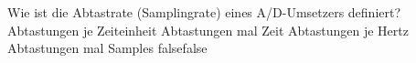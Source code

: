     {Wie ist die Abtastrate (Samplingrate) eines A/D-Umsetzers definiert?}
    {Abtastungen je Zeiteinheit}
    {Abtastungen mal Zeit}
    {Abtastungen je Hertz}
    {Abtastungen mal Samples}
    {false}{false}